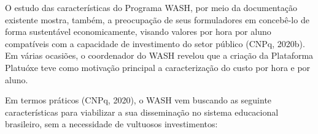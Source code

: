 \noindent\begin{flushright}\mbox{\linespread{1}\selectfont\centering{}}\end{flushright}


O estudo das características do Programa WASH, por meio da documentação existente mostra, também, a preocupação de seus formuladores em concebê-lo de forma sustentável economicamente, visando valores por hora por aluno compatíveis com a capacidade de investimento do setor público  (CNPq, 2020b). Em várias ocasiões, o coordenador do WASH revelou que a criação da Plataforma Platuóxe teve como motivação principal a caracterização do custo por hora e por aluno.

Em termos práticos (CNPq, 2020), o WASH vem buscando as seguinte características para viabilizar a sua disseminação no sistema educacional brasileiro, sem a necessidade de vultuosos investimentos:


